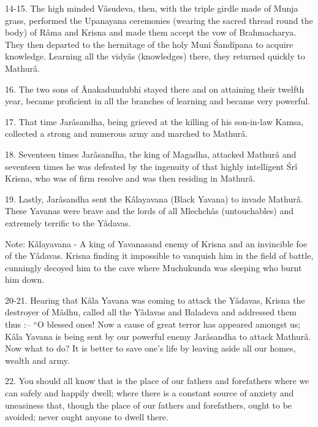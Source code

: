 14-15. The high minded V\^asudeva, then, with the triple girdle made of Munja grass, performed the Upanayana ceremonies (wearing the sacred thread round the body) of R\^ama and Krisna and made them accept the vow of Brahmacharya. They then departed to the hermitage of the holy Muni \'Sand\^ipana to acquire knowledge. Learning all the vidy\^as (knowledges) there, they returned quickly to Mathur\^a.

16. The two sons of \^Anakadundubhi stayed there and on attaining their twelfth year, became proficient in all the branches of learning and became very powerful.

17. That time Jar\^asandha, being grieved at the killing of his son-in-law Kamsa, collected a strong and numerous army and marched to Mathur\^a.

18. Seventeen times Jar\^asandha, the king of Magadha, attacked Mathur\^a and seventeen times he was defeated by the ingenuity of that highly intelligent \'Sr\^i Krisna, who was of firm resolve and was then residing in Mathur\^a.

19. Lastly, Jar\^asandha sent the K\^alayavana (Black Yavana) to invade Mathur\^a. These Yavanas were brave and the lords of all Mlechch\^as (untouchables) and extremely terrific to the Y\^adavas.

Note: K\^alayavana - A king of Yavanas\footnotemark and enemy of Krisna and an invincible foe of the Y\^adavas. Krisna finding it impossible to vanquish him in the field of battle, cunningly decoyed him to the cave where Muchukunda was sleeping who burnt him down.


20-21. Hearing that K\^ala Yavana was coming to attack the Y\^adavas, Krisna the destroyer of M\^adhu, called all the Y\^adavas and Baladeva and addressed them thus :-- ``O blessed ones! Now a cause of great terror has appeared amongst us; K\^ala Yavana is being sent by our powerful enemy Jar\^asandha to attack Mathur\^a. Now what to do? It is better to save one's life by leaving aside all our homes, wealth and army.

22. You should all know that is the place of our fathers and forefathers where we can safely and happily dwell; where there is a constant source of anxiety and uneasiness that, though the place of our fathers and forefathers, ought to be avoided; never ought anyone to dwell there.

